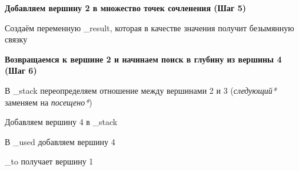 \documentclass[a4paper]{article}
\begin{document}
\textbf{Добавляем вершину 2 в множество точек сочленения (Шаг 5)}
  \begin{figure}[!h]
  \end{figure}
\par
  Создаём переменную \_result, которая в качестве значения получит безымянную связку
\newpage

\textbf{Возвращаемся к вершине 2 и начинаем поиск в глубину из вершины 4 (Шаг 6)}
  \begin{figure}[!h]
  \end{figure}
\par
  В \_stack переопределяем отношение между вершинами 2 и 3 (\textit{следующий*} заменяем на \textit{посещено*})\par
  Добавляем вершину 4 в \_stack\par
  В \_used добавляем вершину 4\par
  \_to получает вершину 1\par
\newpage
\end{document}

